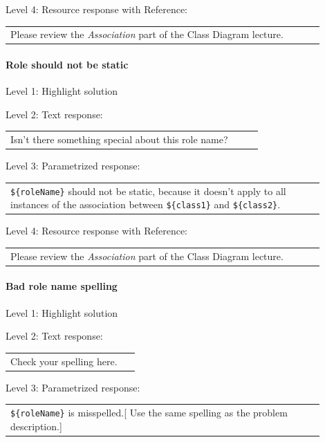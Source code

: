 \noindent Level 4: Resource response with Reference: \medskip

\begin{tabular}{|p{0.9\linewidth}}
Please review the \textit{Association} part of the Class Diagram lecture.
\end{tabular} \medskip


\paragraph{Role should not be static}

\noindent Level 1: Highlight solution \medskip

\noindent Level 2: Text response: \medskip

\begin{tabular}{|p{0.9\linewidth}}
Isn't there something special about this role name?
\end{tabular} \medskip

\noindent Level 3: Parametrized response: \medskip

\begin{tabular}{|p{0.9\linewidth}}
\verb|${roleName}| should not be static, because it doesn't apply to all instances of the association between \verb|${class1}| and \verb|${class2}|.
\end{tabular} \medskip

\noindent Level 4: Resource response with Reference: \medskip

\begin{tabular}{|p{0.9\linewidth}}
Please review the \textit{Association} part of the Class Diagram lecture.
\end{tabular} \medskip


\paragraph{Bad role name spelling}

\noindent Level 1: Highlight solution \medskip

\noindent Level 2: Text response: \medskip

\begin{tabular}{|p{0.9\linewidth}}
Check your spelling here.
\end{tabular} \medskip

\noindent Level 3: Parametrized response: \medskip

\begin{tabular}{|p{0.9\linewidth}}
\verb|${roleName}| is misspelled.[ Use the same spelling as the problem description.]
\end{tabular} \medskip

